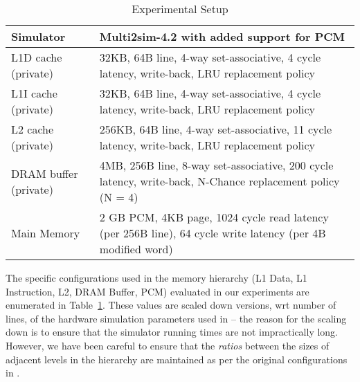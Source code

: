 \begin{center}
\begin{table}[htbp]
\begin{small}
\caption{Experimental Setup}
\label{table:setup}
\begin{tabular}{p{2.5cm}p{10cm}}
\toprule
Simulator & Multi2sim-4.2 with added support for PCM\\ \hline

L1D cache (private) & 32KB, 64B line, 4-way set-associative, 4 cycle latency, write-back, LRU replacement policy\\ \hline
L1I cache (private) & 32KB, 64B line, 4-way set-associative, 4 cycle latency, write-back, LRU replacement policy\\ \hline   
L2 cache (private) & 256KB, 64B line, 4-way set-associative, 11 cycle latency, write-back, LRU replacement policy\\ \hline

DRAM buffer (private) & 4MB, 256B line, 8-way set-associative, 200 cycle latency, write-back, N-Chance replacement policy (N = 4)\\ \hline

Main Memory & 2 GB PCM, 4KB page, 1024 cycle read latency (per 256B line), 64 cycle write latency (per 4B modified word)\\
\bottomrule
\end{tabular}
\end{small}
\end{table}
\end{center}


The specific configurations used in the memory hierarchy (L1 Data,
L1 Instruction, L2, DRAM Buffer, PCM) evaluated in our experiments are
enumerated in Table~\ref{table:setup}.  These values are scaled down
versions, wrt number of lines, of the hardware simulation parameters used
in \cite{wear} -- the reason for the scaling down is to ensure that the
simulator running times are not impractically long. However, we have been
careful to ensure that the \emph{ratios} between the sizes of adjacent
levels in the hierarchy are maintained as per the original configurations
in \cite{wear}.  

\begin{comment}
Further, note that the read-to-write latency ratio is
1:4, significantly lower than the 1:20 of Table ~\ref{tab:tab_pcm_char}
in the Introduction. We wish to point out that this makes our results
\emph{conservative} -- if the ratio is made 1:20, the performance
improvements of the new algorithms  are even more substantial.
\end{comment}

